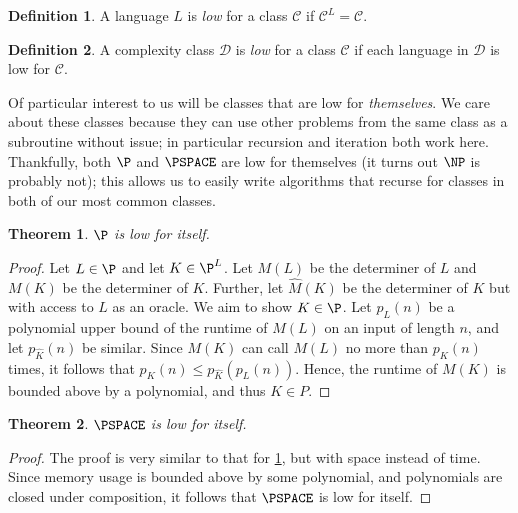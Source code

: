 \documentclass[english,12pt]{reedthesis}
\theoremstyle{plain}
\newtheorem{thm}{Theorem}[section]
\theoremstyle{definition}
\newtheorem{defn}[defn]{Definition}
\theoremstyle{remark}
\begin{document}
\begin{defn}\label{def:low-class}
  A language $L$ is \emph{low} for a class $\mathcal{C}$ if $\mathcal{C}^{L} = \mathcal{C}$.
\end{defn}

\begin{defn}\label{def:low-lang}
  A complexity class $\mathcal{D}$ is \emph{low} for a class $\mathcal{C}$ if each language in $\mathcal{D}$
  is low for $\mathcal{C}$.
\end{defn}

Of particular interest to us will be classes that are low for \emph{themselves}.
We care about these classes because they can use other problems from the same
class as a subroutine without issue; in particular recursion and iteration both
work here. Thankfully, both $\P$ and $\PSPACE$ are low for themselves (it turns
out $\NP$ is probably not); this allows us to easily write algorithms that
recurse for classes in both of our most common classes.

\begin{thm}\label{thm:p-low}
  $\P$ is low for itself.
\end{thm}

\begin{proof}
  Let $L \in \P$ and let $K \in \P^{L}$. Let $M(L)$ be the determiner of $L$ and
  $M(K)$ be the determiner of $K$. Further, let $\hat{M}(K)$ be the determiner
  of $K$ but with access to $L$ as an oracle. We aim to show $K \in \P$. Let
  $p_{L}(n)$ be a polynomial upper bound of the runtime of $M(L)$ on an input of
  length $n$, and let $p_{\hat{K}}(n)$ be similar. Since $M(K)$ can call $M(L)$ no
  more than $p_{\hat{K}}(n)$ times, it follows that
  $p_{K}(n) \le p_{\hat{K}}(p_{L}(n))$. Hence, the runtime of $M(K)$ is bounded
  above by a polynomial, and thus $K \in P$.
\end{proof}

\begin{thm}\label{thm:pspace-low}
  $\PSPACE$ is low for itself.
\end{thm}

\begin{proof}
  The proof is very similar to that for \cref{thm:p-low}, but with space instead
  of time. Since memory usage is bounded above by some polynomial, and
  polynomials are closed under composition, it follows that $\PSPACE$ is low for
  itself.
\end{proof}
\end{document}
